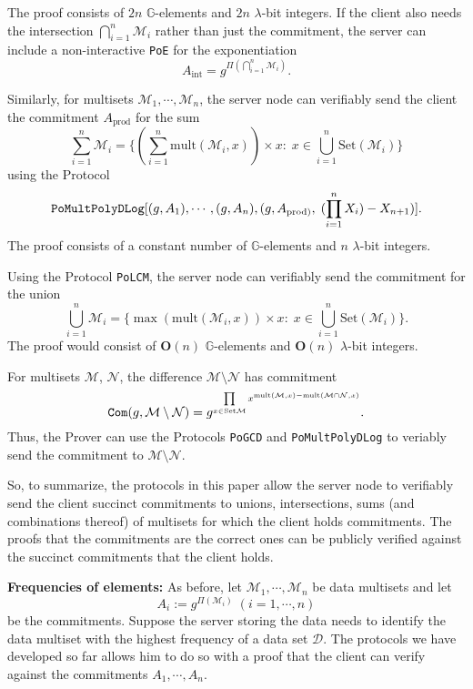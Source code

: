 \documentclass[11pt, lettersize, notitlepage, leqno, footskip=0.6cm]{article}
\newcommand{\pl}{\prod\limits}
\newcommand{\sett}{\mr{Set}}
\newcommand{\mul}{\mr{mult}}
\newcommand{\mc}{\mathcal}
\newcommand{\mb}{\mathbb}
\newcommand{\mbf}{\mathbf}
\newcommand{\mr}{\mathrm}
\newcommand{\sm}{\setminus}
\newcommand{\lam}{\lambda}
\newcommand{\vs}{\vspace{-0.15cm}}
\newcommand{\noin}{\noindent}
\numberwithin{equation}{section}
\begin{document}
The proof consists of $2n$ $\mb{G}$-elements and $2n$ $\lam$-bit integers. If the client also needs the intersection $\bigcap\limits_{i=1}^n \mc{M}_i$ rather than just the commitment, the server can include a non-interactive \verb|PoE| for the exponentiation \vs $$A_{\mr{int}} = g^{\Pi(\bigcap\limits_{i=1}^n \mc{M}_i)}.$$ 


Similarly, for multisets $\mc{M}_1,\cdots,\mc{M}_n$, the server node can verifiably send the client the commitment $A_{\mr{prod}}$ for the sum \vs $$\sum\limits_{i=1}^n \mc{M}_i = \{(\sum\limits_{i=1}^n \mul(\mc{M}_i, x))\times x:\; x\in\bigcup\limits_{i=1}^n \sett(\mc{M}_i)\} $$ using the Protocol \vs $$\protect{\verb|PoMultPolyDLog|}[(g, A_1),\cdots,(g,A_n), (g,A_{\mr{prod})},\;(\pl_{i=1}^{n}X_i)-X_{n+1})].$$ The proof consists of a constant number of $\mb{G}$-elements and $n$ $\lam$-bit integers.

Using the Protocol \verb|PoLCM|, the server node can verifiably send the commitment for the union \vs $$\bigcup\limits_{i=1}^n \mc{M}_i = \{\max(\mul(\mc{M}_i, x))\times x:\; x\in\bigcup\limits_{i=1}^n \sett(\mc{M}_i)\} .$$ The proof would consist of $\mbf{O}(n)$ $\mb{G}$-elements and $\mbf{O}(n)$ $\lam$-bit integers.

For multisets $\mc{M}$, $\mc{N}$, the difference $\mc{M}\sm \mc{N} $ has commitment \vs $$\protect{\verb|Com|}(g, \mc{M}\sm \mc{N}) = g^{\pl_{x\in\sett{\mc{M}}} x^{\mul(\mc{M},x)-\mul(\mc{M\cap \mc{N}},x)}} .$$ Thus, the Prover can use the Protocols \verb|PoGCD| and \verb|PoMultPolyDLog| to veriably send the commitment to $\mc{M}\sm \mc{N} $.

So, to summarize, the protocols in this paper allow the server node to verifiably send the client succinct commitments to unions, intersections, sums (and combinations thereof) of multisets for which the client holds commitments. The proofs that the commitments are the correct ones can be publicly verified against the succinct commitments that the client holds.

\bigskip

\noin \textbf{Frequencies of elements:} As before, let $\mc{M}_1,\cdots, \mc{M}_n$ be data multisets and let \vs $$A_i:= g^{\Pi(\mc{M}_i)}\;(i=1,\cdots,n) $$ be the commitments. Suppose the server storing the data needs to identify the data multiset with the highest frequency of a data set $\mc{D}$. The protocols we have developed so far allows him to do so with a proof that the client can verify against the commitments $A_1,\cdots,A_n$.\vspace{0.1cm}
\end{document}
